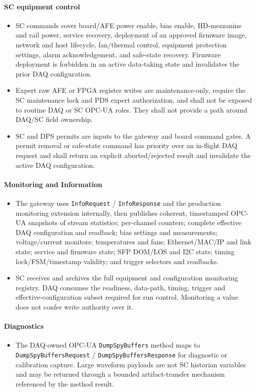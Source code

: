 \paragraph{SC equipment control}
\begin{itemize}[nosep]
  \item SC commands cover board/AFE power enable, bias enable, HD-mezzanine and rail power, service recovery, deployment of an approved firmware image, network and host lifecycle, fan/thermal control, equipment protection settings, alarm acknowledgement, and safe-state recovery. Firmware deployment is forbidden in an active data-taking state and invalidates the prior DAQ configuration.
  \item Expert raw AFE or FPGA register writes are maintenance-only, require the SC maintenance lock and PDS expert authorization, and shall not be exposed to routine DAQ or SC OPC-UA roles. They shall not provide a path around DAQ/SC field ownership.
  \item SC and DPS permits are inputs to the gateway and board command gates. A permit removal or safe-state command has priority over an in-flight DAQ request and shall return an explicit aborted/rejected result and invalidate the active DAQ configuration.
\end{itemize}

\paragraph{Monitoring and Information}
\begin{itemize}[nosep]
  \item The gateway uses \texttt{InfoRequest} / \texttt{InfoResponse} and the production monitoring extension internally, then publishes coherent, timestamped OPC-UA snapshots of stream statistics; per-channel counters; complete effective DAQ configuration and readback; bias settings and measurements; voltage/current monitors; temperatures and fans; Ethernet/MAC/IP and link state; service and firmware state; SFP DOM/LOS and I2C state; timing lock/FSM/timestamp validity; and trigger selectors and readbacks.
  \item SC receives and archives the full equipment and configuration monitoring registry. DAQ consumes the readiness, data-path, timing, trigger and effective-configuration subset required for run control. Monitoring a value does not confer write authority over it.
\end{itemize}

\paragraph{Diagnostics}
\begin{itemize}[nosep]
  \item The DAQ-owned OPC-UA \texttt{DumpSpyBuffers} method maps to \texttt{DumpSpyBuffers}\allowbreak\texttt{Request} / \texttt{DumpSpyBuffers}\allowbreak\texttt{Response} for diagnostic or calibration capture. Large waveform payloads are not SC historian variables and may be returned through a bounded artifact-transfer mechanism referenced by the method result.
  
\end{itemize}

